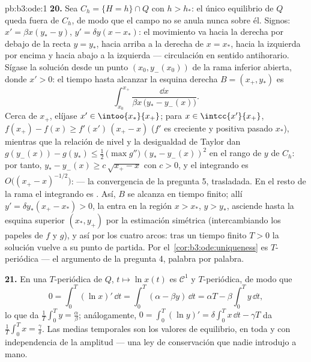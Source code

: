 \begin{solution}{pb:b3:ode:1}
\textbf{20.} Sea $C_h = \{H = h\}\cap Q$ con $h > h_*$: el único
equilibrio de $Q$ queda fuera de $C_h$, de modo que el campo no se anula
nunca sobre él. Signos: $x' = \beta x(y_* - y)$, $y' =
\delta y(x - x_*)$: el movimiento va hacia la derecha por debajo de la
recta $y
= y_*$, hacia arriba a la derecha de $x = x_*$, hacia la izquierda por
encima y hacia abajo a la izquierda --- circulación en sentido
antihorario. Sígase la solución desde un punto $(x_0, y_-(x_0))$ de la
rama inferior abierta, donde $x' > 0$: el tiempo hasta alcanzar la
esquina derecha $B = (x_+, y_*)$ es
\[
\int_{x_0}^{x_+}\frac{\dd x}{\beta x\,\bigl(y_* -
y_-(x)\bigr)} .
\]
Cerca de $x_+$, elíjase $x' \in \intoo{x_*}{x_+}$; para $x \in
\intcc{x'}{x_+}$, $f(x_+) - f(x) \geq f'(x')\,(x_+ - x)$ ($f'$ es
creciente y positiva pasado $x_*$), mientras que la relación de nivel y
la desigualdad de Taylor dan $g(y_-(x)) -
g(y_*) \leq \frac12\,\bigl(\max g''\bigr)\,(y_* -
y_-(x))^2$ en el rango  de $y$
de $C_h$: por tanto, $y_* -
y_-(x) \geq c\,\sqrt{x_+ - x}$ con $c > 0$, y el integrando es
$O\bigl((x_+ - x)^{-1/2}\bigr)$: 
--- la convergencia de la pregunta 5, trasladada. En el resto de la rama
el integrando es . Así, $B$
se alcanza en tiempo finito; allí $y' = \delta y_*(x_+ - x_*) > 0$, la
 entra en la región $x > x_*$,
$y > y_*$, asciende hasta la esquina superior $(x_*, y_+)$ por la
estimación simétrica (intercambiando los papeles de $f$ y $g$), y así
por los cuatro arcos: tras un tiempo finito $T > 0$ la solución vuelve a
su punto de partida. Por el~\cref{cor:b3:ode:uniqueness} es
$T$-periódica --- el argumento de la pregunta 4, palabra por palabra.

\textbf{21.} En una  $T$-periódica
de $Q$, $t \mapsto \ln
x(t)$ es $\mathcal C^1$ y $T$-periódica, de modo que
\[
0 = \int_0^T(\ln x)'\,\dd t
= \int_0^T(\alpha - \beta y)\,\dd t
= \alpha T - \beta\int_0^Ty\,\dd t ,
\]
lo que da $\frac1T\int_0^Ty = \frac\alpha\beta$; análogamente, $0 =
\int_0^T(\ln y)' = \delta\int_0^Tx\,\dd t - \gamma T$ da
$\frac1T\int_0^Tx = \frac\gamma\delta$. Las medias temporales son los
valores de equilibrio, en toda  y
con independencia de la amplitud --- una ley de conservación que nadie
introdujo a mano.


\end{solution}
